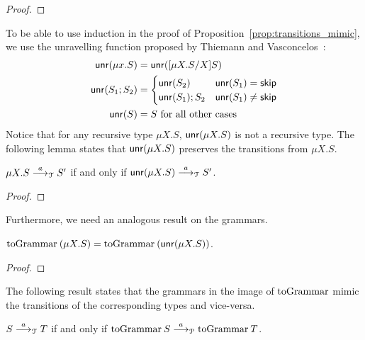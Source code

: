\begin{proof}
\end{proof}

To be able to use induction in the proof of 
Proposition~\ref{prop:transitions_mimic}, we use
the unravelling function proposed 
by Thiemann and Vasconcelos~\cite{thiemann2016context}:
\[\begin{aligned}
\Unravel(\mu x . S) &= \Unravel(\subs{\mu X.S}{X} S)\\
\Unravel(S_1;S_2) &= 
\begin{cases}
	\Unravel(S_2) & \Unravel(S_1)=\skipk\\
	\Unravel(S_1);S_2 & \Unravel(S_1)\neq\skipk\\
\end{cases} \\
\Unravel(S)&= S \text{  for all other cases}
\end{aligned}\]
%
Notice that for any recursive type 
$\mu X.S$, $\Unravel(\mu X.S)$ is not a recursive type.
The following lemma states that $\Unravel(\mu X.S)$ preserves 
the transitions from $\mu X.S$.

\begin{lemma}
\label{lemma:unravelling}
$\mu X. S \LTSderives[a] S'$ if and only if $\Unravel (\mu X. S) \LTSderives[a] S'$.
\end{lemma}
\begin{proof}
\end{proof}

Furthermore, we need an analogous result on the
grammars.

\begin{lemma}
\label{lemma:unravelling_preserves_grammars}
	$\toGrammarf{(\mu X.S)} = \toGrammarf{(\Unravel (\mu X. S))}$.
\end{lemma}
\begin{proof}
\end{proof}

The following result states that the grammars in the image of
$\toGrammark$ mimic the transitions of the corresponding types
and vice-versa.

\begin{proposition}
\label{prop:transitions_mimic}
	$S \LTSderives T$ if and only if 
	$\toGrammarf{S} \LTSderivesP \toGrammarf T$.
\end{proposition}

